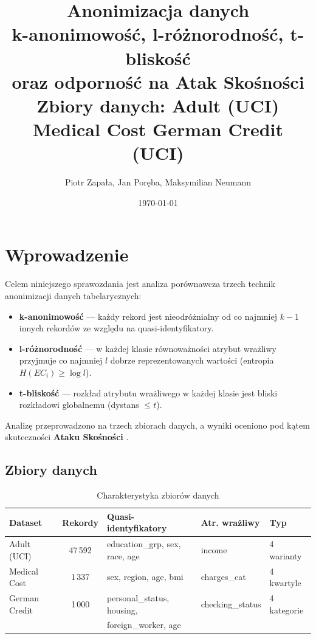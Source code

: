 \documentclass[12pt,a4paper]{article}
\title{
    \vspace{-1cm}
    \Large\textbf{Anonimizacja danych}\\[0.4em]
    \large k-anonimowość, l-różnorodność, t-bliskość\\
    \large oraz odporność na Atak Skośności \\[0.4em]
    \normalsize Zbiory danych: Adult (UCI) \textperiodcentered{} Medical Cost \textperiodcentered{} German Credit (UCI)
}
\author{Piotr Zapała, Jan Poręba, Maksymilian Neumann}
\date{\today}
\begin{document}
\maketitle
\tableofcontents
\newpage

\section{Wprowadzenie}

Celem niniejszego sprawozdania jest analiza porównawcza trzech technik
anonimizacji danych tabelarycznych:

\begin{itemize}
    \item \textbf{k-anonimowość} --- każdy rekord jest nieodróżnialny od
          co najmniej $k{-}1$ innych rekordów ze względu na quasi-identyfikatory.
    \item \textbf{l-różnorodność} --- w każdej klasie równoważności atrybut
          wrażliwy przyjmuje co najmniej $l$ dobrze reprezentowanych wartości
          (entropia $H(EC_i) \geq \log l$).
    \item \textbf{t-bliskość} --- rozkład atrybutu wrażliwego w każdej klasie
          jest bliski rozkładowi globalnemu (dystans $\leq t$).
\end{itemize}

Analizę przeprowadzono na trzech zbiorach danych, a wyniki oceniono pod kątem
skuteczności \textbf{Ataku Skośności} .

\subsection{Zbiory danych}

\begin{table}[H]
\centering
\caption{Charakterystyka zbiorów danych}
\begin{tabular}{lclll}
\toprule
\textbf{Dataset} & \textbf{Rekordy} & \textbf{Quasi-identyfikatory} & \textbf{Atr. wrażliwy} & \textbf{Typ} \\
\midrule
Adult (UCI)   & 47\,592 & education\_grp, sex, race, age & income           & 4 warianty \\
Medical Cost  & 1\,337  & sex, region, age, bmi          & charges\_cat     & 4 kwartyle \\
German Credit & 1\,000  & personal\_status, housing,     & checking\_status & 4 kategorie \\
              &         & foreign\_worker, age           &                  & \\
\bottomrule
\end{tabular}
\end{table}
\end{document}
